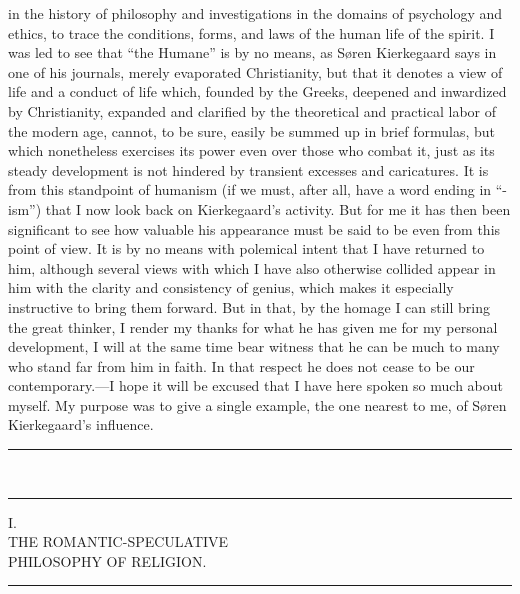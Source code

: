 \documentclass[12pt,a4paper]{book}
\newcommand{\opage}[1]{\marginnote{\footnotesize\textit{[#1]}}}
\begin{document}
in the history of philosophy and investigations in the domains of
psychology and ethics, to trace the conditions, forms, and laws of the
human life of the spirit. I was led to see that ``the Humane'' is by no
means, as Søren Kierkegaard says in one of his journals, merely
evaporated Christianity, but that it denotes a view of life and a conduct
of life which, founded by the Greeks, deepened and inwardized by
Christianity, expanded and clarified by the theoretical and practical
labor of the modern age, cannot, to be sure, easily be summed up in brief
formulas, but which nonetheless exercises its power even over those who
combat it, just as its steady development is not hindered by transient
excesses and caricatures. It is from this standpoint of humanism (if we
must, after all, have a word ending in ``-ism'') that I now look back on
Kierkegaard's activity. But for me it has then been significant to see
how valuable his appearance must be said to be even from this point of
view. It is by no means with polemical intent that I have returned to
him, although several views with which I have also otherwise collided
appear in him with the clarity and consistency of genius, which makes it
especially instructive to bring them forward. But in that, by the homage
I can still bring the great thinker, I render my thanks for what he has
given me for my personal development, I will at the same time bear
witness that he can be much to many who stand far from him in faith. In
that respect he does not cease to be our contemporary.---I hope it will
be excused that I have here spoken so much about myself. My purpose was
to give a single example, the one nearest to me, of Søren Kierkegaard's
influence.
\begin{center}\rule{2cm}{0.4pt}\\[-8pt]\rule{2cm}{0.4pt}\end{center}
\clearpage

\opage{5}\begin{center}I.\\[4pt] THE ROMANTIC-SPECULATIVE\\ PHILOSOPHY OF RELIGION.\\[4pt]\rule{1.5cm}{0.4pt}\end{center}
\end{document}
